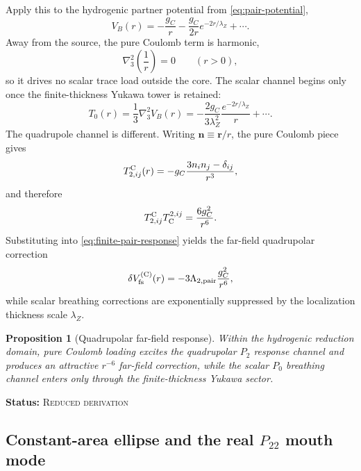 \documentclass[11pt]{article}
\theoremstyle{plain}
\newtheorem{proposition}[theorem]{Proposition}
\theoremstyle{definition}
\theoremstyle{remark}
\newcommand{\statusReduced}{\textsc{Reduced derivation}}
\newcommand{\claimstatus}[1]{\par\smallskip\noindent\textbf{Status:} #1\par\smallskip}
\newcommand{\Ptwotwo}{P_{22}}
\begin{document}
Apply this to the hydrogenic partner potential from \cref{eq:pair-potential},
\begin{equation}
V_B(r)
=
-\frac{g_C}{r}
-\frac{g_C}{2r}e^{-2r/\lambda_Z}
+\cdots.
\label{eq:finite-partner-potential}
\end{equation}
Away from the source, the pure Coulomb term is harmonic,
\begin{equation}
\nabla_3^2\!\left(\frac1r\right)=0
\qquad (r>0),
\label{eq:finite-coulomb-harmonic}
\end{equation}
so it drives no scalar trace load outside the core. The scalar channel begins only once the finite-thickness Yukawa tower is retained:
\begin{equation}
T_0(r)
=
\frac13\nabla_3^2V_B(r)
=
-\frac{2g_C}{3\lambda_Z^2}\frac{e^{-2r/\lambda_Z}}{r}+\cdots.
\label{eq:finite-trace-load-yukawa}
\end{equation}
The quadrupole channel is different. Writing $\mathbf n\equiv \mathbf r/r$, the pure Coulomb piece gives
\begin{equation}
T_{2,ij}^{\rm C}(r)
=
-g_C\frac{3n_in_j-\delta_{ij}}{r^3},
\label{eq:finite-coulomb-tide}
\end{equation}
and therefore
\begin{equation}
T_{2,ij}^{\rm C}T_{\rm C}^{2,ij} = \frac{6g_C^2}{r^6}.
\label{eq:finite-coulomb-tide-square}
\end{equation}
Substituting into \cref{eq:finite-pair-response} yields the far-field quadrupolar correction
\begin{equation}
\delta V_{\rm fs}^{\rm(C)}(r)
=
-3\Lambda_{2,\rm pair}\frac{g_C^2}{r^6},
\label{eq:finite-r6-law}
\end{equation}
while scalar breathing corrections are exponentially suppressed by the localization thickness scale $\lambda_Z$.

\begin{proposition}[Quadrupolar far-field response]\label{prop:quadrupolar-far-field-response}
Within the hydrogenic reduction domain, pure Coulomb loading excites the quadrupolar $P_2$ response channel and produces an attractive $r^{-6}$ far-field correction, while the scalar $P_0$ breathing channel enters only through the finite-thickness Yukawa sector.
\end{proposition}
\claimstatus{\statusReduced}

\subsection{Constant-area ellipse and the real \texorpdfstring{$\Ptwotwo$}{P22} mouth mode}\label{subsec:finite-p22-ellipse}
\end{document}
